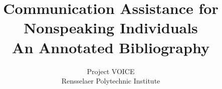 \documentclass [11pt]{article}
\title{Communication Assistance for Nonspeaking Individuals\\\medskip An Annotated Bibliography}
\author{Project VOICE\\Rensselaer Polytechnic Institute}
\begin{document}
\maketitle
\nocite{*}


\end{document}
